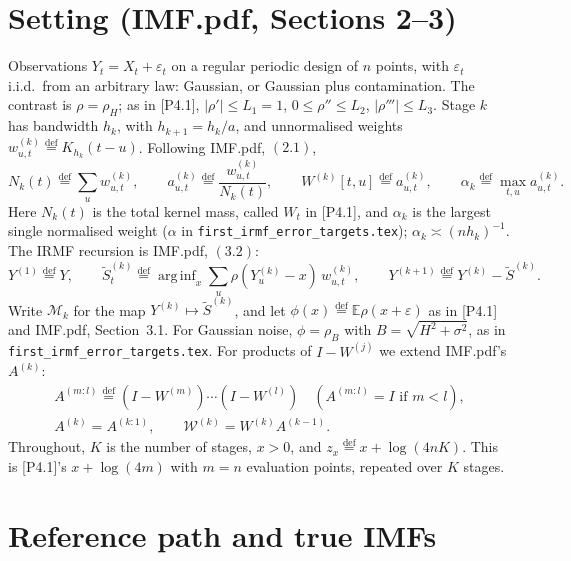 \documentclass[11pt]{article}
\newcommand{\E}{\mathbb{E}}
\newcommand{\defeq}{\stackrel{\mathrm{def}}{=}}
\newcommand{\arginf}{\mathop{\mathrm{arg\,inf}}}
\newcommand{\IMFt}{\widetilde S}
\newcommand{\Wcal}{\mathcal W}
\theoremstyle{definition}
\begin{document}
\section{Setting (IMF.pdf, Sections 2--3)}

Observations \(Y_t=X_t+\varepsilon_t\) on a regular periodic design of \(n\)
points, with \(\varepsilon_t\) i.i.d.\ from an arbitrary law: Gaussian, or
Gaussian plus contamination.  The contrast is \(\rho=\rho_H\); as in [P4.1],
\(|\rho'|\le L_1=1\), \(0\le\rho''\le L_2\), \(|\rho'''|\le L_3\).  Stage \(k\)
has bandwidth \(h_k\), with \(h_{k+1}=h_k/a\), and unnormalised weights
\(w^{(k)}_{u,t}\defeq K_{h_k}(t-u)\).  Following IMF.pdf, \((2.1)\),
\[
  N_k(t)\defeq\sum_uw^{(k)}_{u,t},\qquad
  a^{(k)}_{u,t}\defeq\frac{w^{(k)}_{u,t}}{N_k(t)},\qquad
  W^{(k)}[t,u]\defeq a^{(k)}_{u,t},\qquad
  \alpha_k\defeq\max_{t,u}a^{(k)}_{u,t}.
\]
Here \(N_k(t)\) is the total kernel mass, called \(W_t\) in [P4.1], and
\(\alpha_k\) is the largest single normalised weight (\(\alpha\) in
\texttt{first\_irmf\_error\_targets.tex}); \(\alpha_k\asymp(nh_k)^{-1}\).
The IRMF recursion is IMF.pdf, \((3.2)\):
\[
  Y^{(1)}\defeq Y,\qquad
  \IMFt^{(k)}_t\defeq\arginf_x\sum_u\rho(Y^{(k)}_u-x)\,w^{(k)}_{u,t},\qquad
  Y^{(k+1)}\defeq Y^{(k)}-\IMFt^{(k)}.
\]
Write \(\mathcal M_k\) for the map \(Y^{(k)}\mapsto\IMFt^{(k)}\), and let
\(\phi(x)\defeq\E\rho(x+\varepsilon)\) as in [P4.1] and IMF.pdf, Section~3.1.
For Gaussian noise, \(\phi=\rho_B\) with \(B=\sqrt{H^2+\sigma^2}\), as in
\texttt{first\_irmf\_error\_targets.tex}.  For products of
\(I-W^{(j)}\) we extend IMF.pdf's \(A^{(k)}\):
\begin{gather*}
  A^{(m:l)}\defeq(I-W^{(m)})\cdots(I-W^{(l)})\quad(A^{(m:l)}=I\text{ if }m<l),\\
  A^{(k)}=A^{(k:1)},\qquad \Wcal^{(k)}=W^{(k)}A^{(k-1)} .
\end{gather*}
Throughout, \(K\) is the number of stages, \(x>0\), and
\(z_x\defeq x+\log(4nK)\).  This is [P4.1]'s \(x+\log(4m)\) with \(m=n\)
evaluation points, repeated over \(K\) stages.

\section{Reference path and true IMFs}\label{sec:reference}
\end{document}
